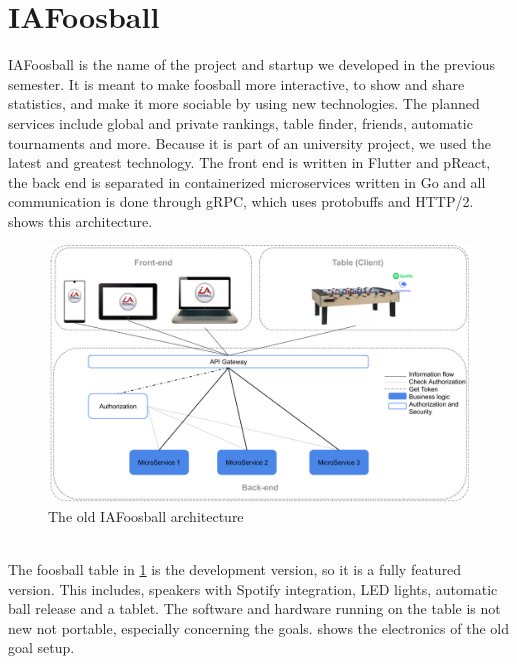 \section{IAFoosball}
IAFoosball is the name of the project and startup we developed in the previous semester. It is meant to make foosball more interactive, to show and share statistics, and make it more sociable by using new technologies. The planned services include global and private rankings, table finder, friends, automatic tournaments and more. Because it is part of an university project, we used the latest and greatest technology. The front end is written in Flutter and pReact, the back end is separated in containerized microservices written in Go and all communication is done through gRPC, which uses protobuffs and HTTP/2.  shows this architecture.
\begin{figure}[h!]
    \centering
    \includegraphics[scale=0.2]{figures/architecture-old.png}%
    \caption{The old IAFoosball architecture}\label{fig:architectureOld}
\end{figure}\\
The foosball table in \cref{fig:architectureOld} is the development version, so it is a fully featured version. This includes, speakers with Spotify integration, LED lights, automatic ball release and a tablet. The software and hardware running on the table is not new not portable, especially concerning the goals.  shows the electronics of the old goal setup.
